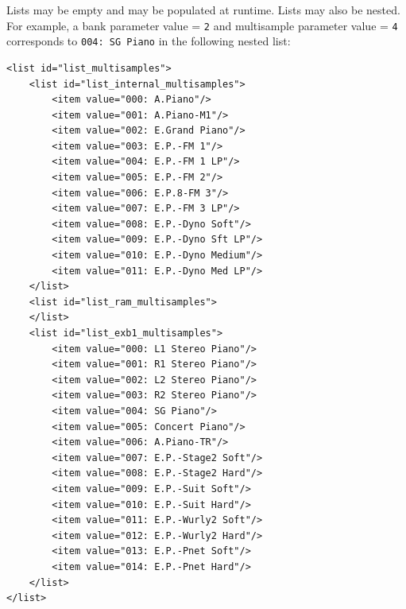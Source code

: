 \documentclass[a4paper,twoside,12pt]{article}
\newcommand{\code}[1]{\color{red}\texttt{#1}\color{black}}
\begin{document}
Lists may be empty and may be populated at runtime. Lists may also
be nested. For example, a bank parameter value = \code{2}{} and
multisample parameter value = \code{4}{} corresponds to \code{004:
SG Piano}{} in the following nested list:
\begin{verbatim}
<list id="list_multisamples">
    <list id="list_internal_multisamples">
        <item value="000: A.Piano"/>
        <item value="001: A.Piano-M1"/>
        <item value="002: E.Grand Piano"/>
        <item value="003: E.P.-FM 1"/>
        <item value="004: E.P.-FM 1 LP"/>
        <item value="005: E.P.-FM 2"/>
        <item value="006: E.P.8-FM 3"/>
        <item value="007: E.P.-FM 3 LP"/>
        <item value="008: E.P.-Dyno Soft"/>
        <item value="009: E.P.-Dyno Sft LP"/>
        <item value="010: E.P.-Dyno Medium"/>
        <item value="011: E.P.-Dyno Med LP"/>
    </list>
    <list id="list_ram_multisamples">
    </list>
    <list id="list_exb1_multisamples">
        <item value="000: L1 Stereo Piano"/>
        <item value="001: R1 Stereo Piano"/>
        <item value="002: L2 Stereo Piano"/>
        <item value="003: R2 Stereo Piano"/>
        <item value="004: SG Piano"/>
        <item value="005: Concert Piano"/>
        <item value="006: A.Piano-TR"/>
        <item value="007: E.P.-Stage2 Soft"/>
        <item value="008: E.P.-Stage2 Hard"/>
        <item value="009: E.P.-Suit Soft"/>
        <item value="010: E.P.-Suit Hard"/>
        <item value="011: E.P.-Wurly2 Soft"/>
        <item value="012: E.P.-Wurly2 Hard"/>
        <item value="013: E.P.-Pnet Soft"/>
        <item value="014: E.P.-Pnet Hard"/>
    </list>
</list>
\end{verbatim}
\end{document}
